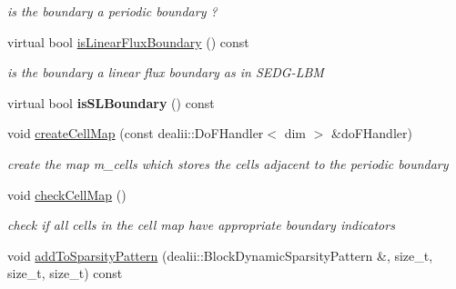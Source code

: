 \begin{DoxyCompactItemize}
\begin{DoxyCompactList}\small\item\em is the boundary a periodic boundary ? \item\end{DoxyCompactList}\item 
\hypertarget{classnatrium_1_1PeriodicBoundary_a8e2e849b0086d1d19518894d92cc9ec0}{
virtual bool \hyperlink{classnatrium_1_1PeriodicBoundary_a8e2e849b0086d1d19518894d92cc9ec0}{isLinearFluxBoundary} () const }
\label{classnatrium_1_1PeriodicBoundary_a8e2e849b0086d1d19518894d92cc9ec0}

\begin{DoxyCompactList}\small\item\em is the boundary a linear flux boundary as in SEDG-\/LBM \item\end{DoxyCompactList}\item 
\hypertarget{classnatrium_1_1PeriodicBoundary_a324efe2ded446a20123f229748e7d016}{
virtual bool {\bfseries isSLBoundary} () const }
\label{classnatrium_1_1PeriodicBoundary_a324efe2ded446a20123f229748e7d016}

\item 
void \hyperlink{classnatrium_1_1PeriodicBoundary_a233d460baa307b13bc32efb57c07f7c5}{createCellMap} (const dealii::DoFHandler$<$ dim $>$ \&doFHandler)
\begin{DoxyCompactList}\small\item\em create the map m\_\-cells which stores the cells adjacent to the periodic boundary \item\end{DoxyCompactList}\item 
\hypertarget{classnatrium_1_1PeriodicBoundary_a4885d5d5d4c8965db5534390ad877511}{
void \hyperlink{classnatrium_1_1PeriodicBoundary_a4885d5d5d4c8965db5534390ad877511}{checkCellMap} ()}
\label{classnatrium_1_1PeriodicBoundary_a4885d5d5d4c8965db5534390ad877511}

\begin{DoxyCompactList}\small\item\em check if all cells in the cell map have appropriate boundary indicators \item\end{DoxyCompactList}\item 
\hypertarget{classnatrium_1_1PeriodicBoundary_af46e4e91a6b612fb3b2ef658b962d5d8}{
void \hyperlink{classnatrium_1_1PeriodicBoundary_af46e4e91a6b612fb3b2ef658b962d5d8}{addToSparsityPattern} (dealii::BlockDynamicSparsityPattern \&, size\_\-t, size\_\-t, size\_\-t) const }
\label{classnatrium_1_1PeriodicBoundary_af46e4e91a6b612fb3b2ef658b962d5d8}


\end{DoxyCompactItemize}
